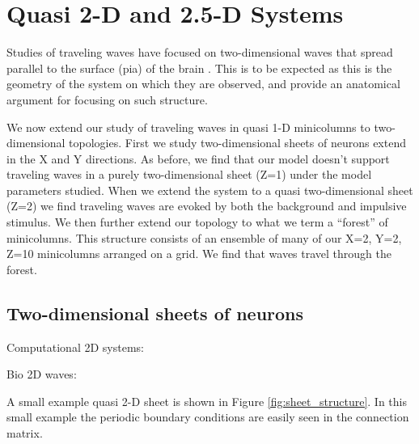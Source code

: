 
\chapter{Quasi 2-D and 2.5-D Systems}
Studies of traveling waves have focused on two-dimensional waves that spread parallel to the surface (pia) of the brain \citep{reimer2010}\citep{keane2015}\citep{Townsend2018}\citep{Golomb1997}\citep{Qi2015}. 
This is to be expected as this is the geometry of the system on which they are observed, and \citep{Wilson1973} provide an anatomical argument for focusing on such structure. 

We now extend our study of traveling waves in quasi 1-D minicolumns to two-dimensional topologies.
First we study two-dimensional sheets of neurons extend in the X and Y directions.
As before, we find that our model doesn't support traveling waves in a purely two-dimensional sheet (Z=1) under the model parameters studied.
When we extend the system to a quasi two-dimensional sheet (Z=2) we find traveling waves are evoked by both the background and impulsive stimulus.
We then further extend our topology to what we term a ``forest'' of minicolumns.
This structure consists of an ensemble of many of our X=2, Y=2, Z=10 minicolumns arranged on a grid.
We find that waves travel through the forest.

\section{Two-dimensional sheets of neurons}
Computational 2D systems: \citet{keane2015}\citet{Spreizer2019}

Bio 2D waves: \citet{huang2004}\citet{Townsend2018}

A small example quasi 2-D sheet is shown in Figure \ref{fig:sheet_structure}.
In this small example the periodic boundary conditions are easily seen in the connection matrix.

